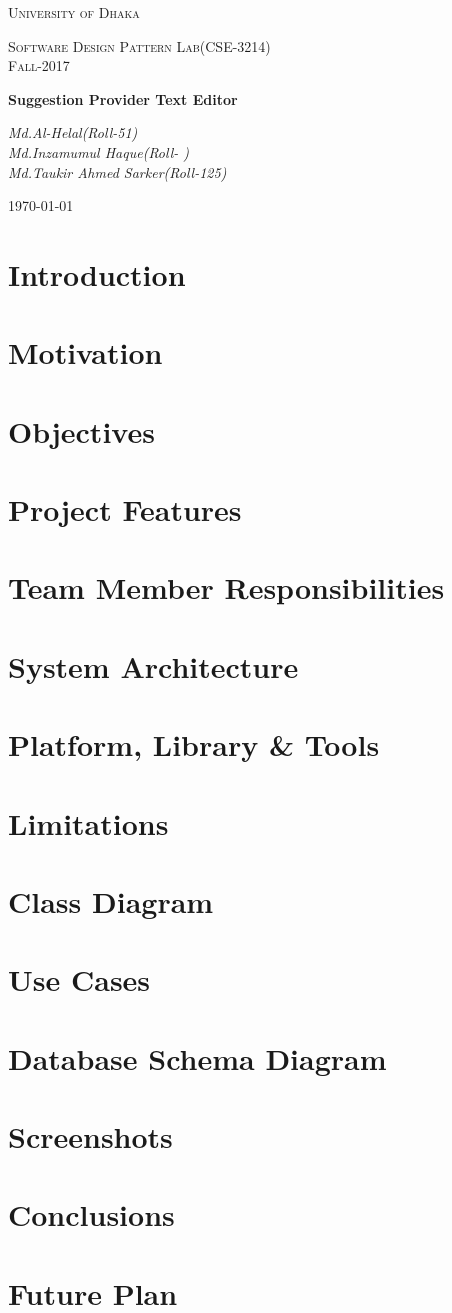 \documentclass[a4paper]{article}
\begin{document}
\begin{titlepage}
\centering
{\scshape\LARGE University of Dhaka \par}
\vspace{1cm}
\vfill
{\scshape\Large Software Design Pattern Lab(CSE-3214)\\Fall-2017\par}
\vspace{1.5cm}
\vfill
{\huge\bfseries Suggestion Provider Text Editor\par}
\vspace{2cm}
\vfill
{\Large\itshape Md.Al-Helal(Roll-51)\\Md.Inzamumul Haque(Roll-  )\\Md.Taukir Ahmed Sarker(Roll-125)\par}
\vfill
{\large \today\par}
\end{titlepage}

\section{Introduction}
\section{Motivation}
\section{Objectives}
\section{Project Features}
\section{Team Member Responsibilities}
\section{System Architecture}
\section{Platform, Library & Tools}
\section{Limitations}
\section{Class Diagram}
\section{Use Cases}
\section{Database Schema Diagram}
\section{Screenshots}
\section{Conclusions}
\section{Future Plan}
\end{document}
